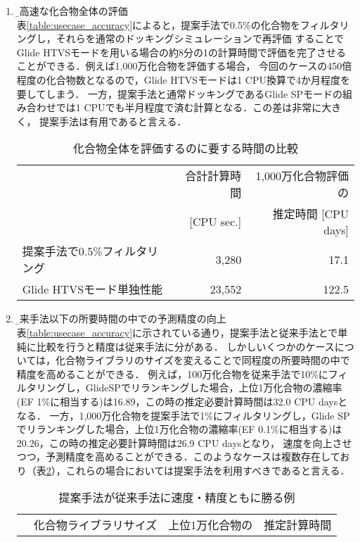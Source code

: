 \begin{enumerate}
\item \b{超高速な化合物全体の評価}\\
	表\ref{table:usecase_accuracy}によると，提案手法で0.5\%の化合物をフィルタリングし，それらを通常のドッキングシミュレーションで再評価
	することでGlide HTVSモードを用いる場合の約8分の1の計算時間で評価を完了させることができる．例えば1,000万化合物を評価する場合，
	今回のケースの450倍程度の化合物数となるので，Glide HTVSモードは1 CPU換算で4か月程度を要してしまう．
	一方，提案手法と通常ドッキングであるGlide SPモードの組み合わせでは1 CPUでも半月程度で済む計算となる．この差は非常に大きく，
	提案手法は有用であると言える．
\begin{table}[htbp] \centering
	\caption{化合物全体を評価するのに要する時間の比較}
	\label{calc_speed_ultrafast}
	\begin{tabular}{l|rr}
	\hline
												&合計計算時間	&1,000万化合物評価の		\\ 
												&[CPU sec.]		&推定時間 [CPU days]		\\ \hline
	提案手法で0.5\%フィルタリング	&3,280				&17.1								\\
	Glide HTVSモード単独性能		&23,552				&122.5								\\ \hline
	\end{tabular}
\end{table}
\item \b{従来手法以下の所要時間の中での予測精度の向上}\\
	表\ref{table:usecase_accuracy}に示されている通り，提案手法と従来手法とで単純に比較を行うと精度は従来手法に分がある．
	しかしいくつかのケースについては，化合物ライブラリのサイズを変えることで同程度の所要時間の中で精度を高めることができる．
	例えば，100万化合物を従来手法で10\%にフィルタリングし，GlideSPでリランキングした場合，上位1万化合物の濃縮率(EF 1\%に相当する)は16.89，この時の推定必要計算時間は32.0 CPU daysとなる．
	一方，1,000万化合物を提案手法で1\%にフィルタリングし，Glide SPでリランキングした場合，上位1万化合物の濃縮率(EF 0.1\%に相当する)は20.26，この時の推定必要計算時間は26.9 CPU daysとなり，
	速度を向上させつつ，予測精度を高めることができる．このようなケースは複数存在しており（表\ref{table:win_proposal_case}），これらの場合においては提案手法を利用すべきであると言える．
\begin{table}[htbp] \centering
	\caption{提案手法が従来手法に速度・精度ともに勝る例}
	\label{table:win_proposal_case}
	\begin{tabular}{l|rrr}
	\hline
												&\multirow{2}{*}{化合物ライブラリサイズ}	&上位1万化合物の		&推定計算時間	\\

\end{tabular}
\end{table}
\end{enumerate}
